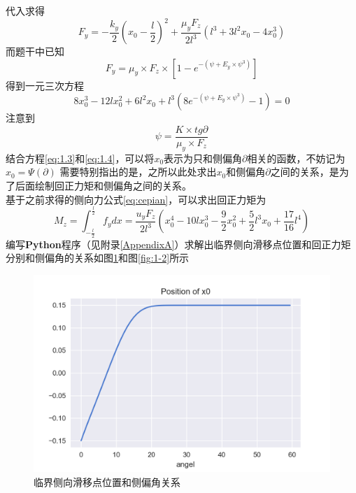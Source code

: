 \documentclass[paper=a4, fontsize=11pt]{scrartcl} %
\numberwithin{equation}{section} %
\numberwithin{figure}{section} %
\numberwithin{table}{section} %
\begin{document}
代入求得
\begin{equation}
F_y = -\frac{k_y}{2}(x_0-\frac{l}{2})^2 + \frac{\mu_y F_z}{2l^3}(l^3+3l^2x_0-4x_0^3)
\end{equation}
而题干中已知
\begin{equation}
F_y = \mu_y \times F_z \times \left[1-e^{-(\psi + E_y \times \psi^3)}\right]
\end{equation}
得到一元三次方程
\begin{equation} 
\label{eq:1.3}
8x_0^3 -12lx_0^2 + 6l^2x_0 + l^3(8e^{-(\psi + E_y \times \psi^3)}-1) = 0
\end{equation}
注意到
\begin{equation}
\label{eq:1.4}
\psi = \frac{K \times tg{\partial}}{\mu_y \times F_z}
\end{equation}
结合方程\ref{eq:1.3}和\ref{eq:1.4}，可以将$x_0$表示为只和侧偏角$\partial$相关的函数，不妨记为$x_0 = \Psi(\partial)$
需要特别指出的是，之所以此处求出$x_0$和侧偏角$\partial$之间的关系，是为了后面绘制回正力矩和侧偏角之间的关系。\\
基于之前求得的侧向力公式\ref{eq:cepian}，可以求出回正力矩为
\begin{equation}
M_z = \int_{-\frac{l}{2}}^{\frac{l}{2}} f_y dx = \frac{u_yF_z}{2l^3}\left(x_0^4 -10lx_0^3 -\frac{9}{2}x_0^2 + \frac{5}{2}l^3x_0 + \frac{17}{16}l^4 \right)
\end{equation}
编写\textbf{Python}程序（见附录\ref{AppendixA}）求解出临界侧向滑移点位置和回正力矩分别和侧偏角的关系如图\ref{fig:1-1}和图\ref{fig:1-2}所示
\begin{figure}[ht]
\centering
\includegraphics[width=\textwidth]{1-1.png}
\caption{临界侧向滑移点位置和侧偏角关系}
\label{fig:1-1}
\end{figure}
\end{document}
